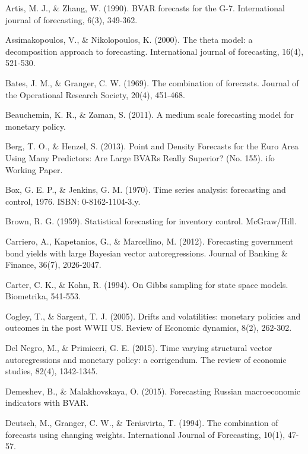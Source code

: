 \newpage
\begin{thebibliography}{99}

Artis, M. J., \& Zhang, W. (1990). BVAR forecasts for the G-7. International journal of forecasting, 6(3), 349-362.

Assimakopoulos, V., \& Nikolopoulos, K. (2000). The theta model: a decomposition approach to forecasting. International journal of forecasting, 16(4), 521-530. 

Bates, J. M., \& Granger, C. W. (1969). The combination of forecasts. Journal of the Operational Research Society, 20(4), 451-468.

Beauchemin, K. R., \& Zaman, S. (2011). A medium scale forecasting model for monetary policy.

Berg, T. O., \& Henzel, S. (2013). Point and Density Forecasts for the Euro Area Using Many Predictors: Are Large BVARs Really Superior? (No. 155). ifo Working Paper.

Box, G. E. P., \& Jenkins, G. M. (1970). Time series analysis: forecasting and control, 1976. ISBN: 0-8162-1104-3.y.

Brown, R. G. (1959). Statistical forecasting for inventory control. McGraw/Hill.

Carriero, A., Kapetanios, G., \& Marcellino, M. (2012). Forecasting government bond yields with large Bayesian vector autoregressions. Journal of Banking \& Finance, 36(7), 2026-2047.

Carter, C. K., \& Kohn, R. (1994). On Gibbs sampling for state space models. Biometrika, 541-553.

Cogley, T., \& Sargent, T. J. (2005). Drifts and volatilities: monetary policies and outcomes in the post WWII US. Review of Economic dynamics, 8(2), 262-302.

Del Negro, M., \& Primiceri, G. E. (2015). Time varying structural vector autoregressions and monetary policy: a corrigendum. The review of economic studies, 82(4), 1342-1345.

Demeshev, B., \& Malakhovskaya, O. (2015). Forecasting Russian macroeconomic indicators with BVAR.

Deutsch, M., Granger, C. W., \& Teräsvirta, T. (1994). The combination of forecasts using changing weights. International Journal of Forecasting, 10(1), 47-57.


\end{thebibliography}
